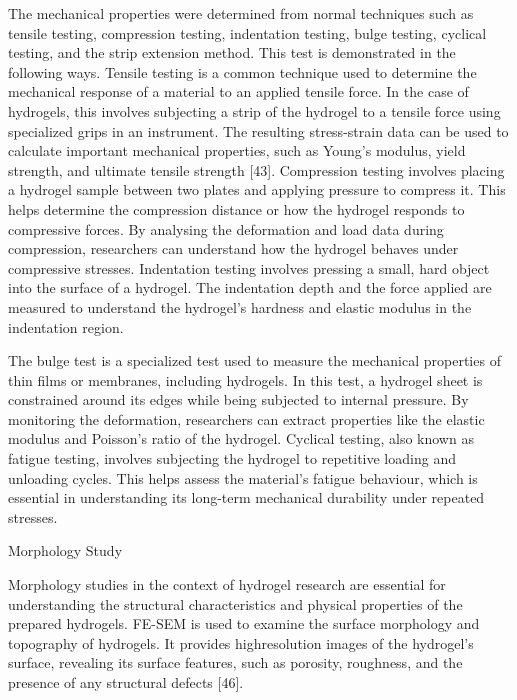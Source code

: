 \documentclass[../../main-notes.tex]{subfiles}
\begin{document}
The mechanical properties were determined from normal techniques such as tensile testing, compression testing, indentation testing, bulge testing, cyclical testing, and the strip extension method. 
This test is demonstrated in the following ways. 
Tensile testing is a common technique used to determine the mechanical response of a material to an applied tensile force. 
In the case of hydrogels, this involves subjecting a strip of the hydrogel to a tensile force using specialized grips in an instrument. 
The resulting stress-strain data can be used to calculate important mechanical properties, such as Young’s modulus, yield strength, and ultimate tensile strength [43]. 
Compression testing involves placing a hydrogel sample between two plates and applying pressure to compress it. 
This helps determine the compression distance or how the hydrogel responds to compressive forces. 
By analysing the deformation and load data during compression, researchers can understand how the hydrogel behaves under compressive stresses. 
Indentation testing involves pressing a small, hard object into the surface of a hydrogel. 
The indentation depth and the force applied are measured to understand the hydrogel’s hardness and elastic modulus in the indentation region. 

The bulge test is a specialized test used to measure the mechanical properties of thin films or membranes, including hydrogels. 
In this test, a hydrogel sheet is constrained around its edges while being subjected to internal pressure. 
By monitoring the deformation, researchers can extract properties like the elastic modulus and Poisson’s ratio of the hydrogel. 
Cyclical testing, also known as fatigue testing, involves subjecting the hydrogel to repetitive loading and unloading cycles. 
This helps assess the material’s fatigue behaviour, which is essential in understanding its long-term mechanical durability under repeated stresses.






Morphology Study

Morphology studies in the context of hydrogel research are essential for understanding the structural characteristics and physical properties of the prepared hydrogels. 
FE-SEM is used to examine the surface morphology and topography of hydrogels. 
It provides highresolution images of the hydrogel’s surface, revealing its surface features, such as porosity, roughness, and the presence of any structural defects [46]. 
\end{document}
